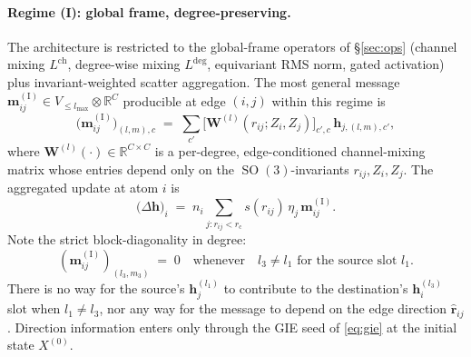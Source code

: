 \documentclass[11pt,a4paper]{article}
\DeclareMathOperator{\SO}{SO}
\newcommand{\R}{\mathbb{R}}
\newcommand{\brh}{\hat{\bm{r}}}
\newcommand{\bh}{\bm{h}}
\newcommand{\rcut}{r_{\mathrm{c}}}
\newcommand{\lmax}{l_{\max}}
\theoremstyle{plain}
\theoremstyle{definition}
\theoremstyle{remark}
\begin{document}
\paragraph{Regime (I): global frame, degree-preserving.}
The architecture is restricted to the global-frame operators of \S\ref{sec:ops}
(channel mixing $L^{\mathrm{ch}}$, degree-wise mixing $L^{\mathrm{deg}}$,
equivariant RMS norm, gated activation) plus invariant-weighted scatter
aggregation. The most general message $\bm{m}_{ij}^{\mathrm{(I)}}\in
    V_{\le\lmax}\otimes\R^{C}$ producible at edge $(i,j)$ within this regime is
\begin{equation}\label{eq:regI-msg}
    \bigl(\bm{m}_{ij}^{\mathrm{(I)}}\bigr)_{(l,m),c}
    \;=\;\sum_{c'}\bigl[\bm{W}^{(l)}(r_{ij};Z_i,Z_j)\bigr]_{c',c}\,\bh_{j,(l,m),c'},
\end{equation}
where $\bm{W}^{(l)}(\cdot)\in\R^{C\times C}$ is a per-degree, edge-conditioned channel-mixing matrix whose entries depend only on the $\SO(3)$-invariants $r_{ij},Z_i,Z_j$.
The aggregated update at atom $i$ is
\begin{equation}\label{eq:regI-agg}
    \bigl(\Delta\bh\bigr)_i \;=\; n_i\sum_{j:r_{ij}<\rcut} s(r_{ij})\,\eta_j\,\bm{m}_{ij}^{\mathrm{(I)}}.
\end{equation}
Note the strict block-diagonality in degree:
\begin{equation}\label{eq:regI-blockdiag}
    (\bm{m}_{ij}^{\mathrm{(I)}})_{(l_3,m_3)} \;=\;0\quad\text{whenever}\quad l_3\neq l_1\text{ for the source slot }l_1.
\end{equation}
There is no way for the source's $\bh_j^{(l_1)}$ to contribute to the destination's $\bh_i^{(l_3)}$ slot when $l_1\ne l_3$, nor any way for the message to depend on the edge direction $\brh_{ij}$.
Direction information enters only through the GIE seed of \eqref{eq:gie} at the initial state $X^{(0)}$.
\end{document}
